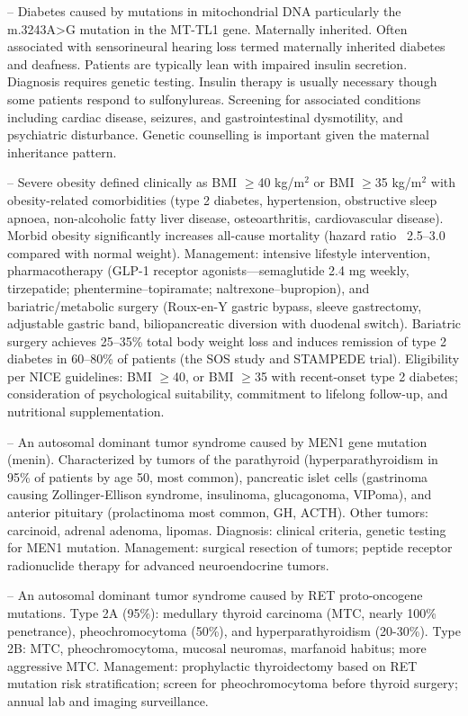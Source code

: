 -- Diabetes caused by mutations in mitochondrial DNA particularly the m.3243A>G mutation in the MT-TL1 gene. Maternally inherited. Often associated with sensorineural hearing loss termed maternally inherited diabetes and deafness. Patients are typically lean with impaired insulin secretion. Diagnosis requires genetic testing. Insulin therapy is usually necessary though some patients respond to sulfonylureas. Screening for associated conditions including cardiac disease, seizures, and gastrointestinal dysmotility, and psychiatric disturbance. Genetic counselling is important given the maternal inheritance pattern.

-- Severe obesity defined clinically as BMI \(\ge\)40 kg/m\(^2\) or BMI \(\ge\)35 kg/m\(^2\) with obesity-related comorbidities (type 2 diabetes, hypertension, obstructive sleep apnoea, non-alcoholic fatty liver disease, osteoarthritis, cardiovascular disease). Morbid obesity significantly increases all-cause mortality (hazard ratio ~2.5--3.0 compared with normal weight). Management: intensive lifestyle intervention, pharmacotherapy (GLP-1 receptor agonists—semaglutide 2.4 mg weekly, tirzepatide; phentermine--topiramate; naltrexone--bupropion), and bariatric/metabolic surgery (Roux-en-Y gastric bypass, sleeve gastrectomy, adjustable gastric band, biliopancreatic diversion with duodenal switch). Bariatric surgery achieves 25--35\% total body weight loss and induces remission of type 2 diabetes in 60--80\% of patients (the SOS study and STAMPEDE trial). Eligibility per NICE guidelines: BMI \(\ge\)40, or BMI \(\ge\)35 with recent-onset type 2 diabetes; consideration of psychological suitability, commitment to lifelong follow-up, and nutritional supplementation.

-- An autosomal dominant tumor syndrome caused by MEN1 gene mutation (menin). Characterized by tumors of the parathyroid (hyperparathyroidism in 95\% of patients by age 50, most common), pancreatic islet cells (gastrinoma causing Zollinger-Ellison syndrome, insulinoma, glucagonoma, VIPoma), and anterior pituitary (prolactinoma most common, GH, ACTH). Other tumors: carcinoid, adrenal adenoma, lipomas. Diagnosis: clinical criteria, genetic testing for MEN1 mutation. Management: surgical resection of tumors; peptide receptor radionuclide therapy for advanced neuroendocrine tumors.

-- An autosomal dominant tumor syndrome caused by RET proto-oncogene mutations. Type 2A (95\%): medullary thyroid carcinoma (MTC, nearly 100\% penetrance), pheochromocytoma (50\%), and hyperparathyroidism (20-30\%). Type 2B: MTC, pheochromocytoma, mucosal neuromas, marfanoid habitus; more aggressive MTC. Management: prophylactic thyroidectomy based on RET mutation risk stratification; screen for pheochromocytoma before thyroid surgery; annual lab and imaging surveillance.

